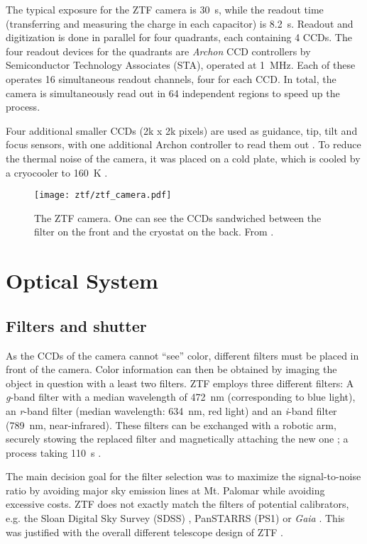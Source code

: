 The typical exposure for the ZTF camera is \SI{30}{\second}, while the readout time (transferring and measuring the charge in each capacitor) is \SI{8.2}{\second}. Readout and digitization is done in parallel for four quadrants, each containing 4 CCDs. The four readout devices for the quadrants are \textit{Archon} CCD controllers by Semiconductor Technology Associates (STA), operated at \SI{1}{\mega\Hz}. Each of these operates 16 simultaneous readout channels, four for each CCD. In total, the camera is simultaneously read out in 64 independent regions to speed up the process.

Four additional smaller CCDs (2k x 2k pixels) are used as guidance, tip, tilt and focus sensors, with one additional Archon controller to read them out . To reduce the thermal noise of the camera, it was placed on a cold plate, which is cooled by a cryocooler to \SI{160}{\kelvin} \cite{Dekany2016}.

\begin{figure}[htb]
    \texttt{[image: ztf/ztf\_camera.pdf]}
    \caption[ZTF camera]{The ZTF camera. One can see the CCDs sandwiched between the filter on the front and the cryostat on the back. From \cite{Bellm2019}.}
\end{figure}

\section{Optical System}

\subsection{Filters and shutter}
As the CCDs of the camera cannot ``see'' color, different filters must be placed in front of the camera. Color information can then be obtained by imaging the object in question with a least two filters. ZTF employs three different filters: A \textit{g}-band filter with a median wavelength of \SI{472}{\nano \meter} (corresponding to blue light), an \textit{r}-band filter (median wavelength: \SI{634}{\nano \meter}, red light) and an \textit{i}-band filter (\SI{789}{\nano \meter}, near-infrared). These filters can be exchanged with a robotic arm, securely stowing the replaced filter and magnetically attaching the new one \cite{Dekany2020}; a process taking \SI{110}{\second} \cite{Bellm2019}. 

The main decision goal for the filter selection was to maximize the signal-to-noise ratio by avoiding major sky emission lines at Mt. Palomar while avoiding excessive costs. ZTF does not exactly match the filters of potential calibrators, e.g. the Sloan Digital Sky Survey (SDSS) , PanSTARRS (PS1)  or \textit{Gaia} . This was justified with the overall different telescope design of ZTF \cite{Bellm2019}.

